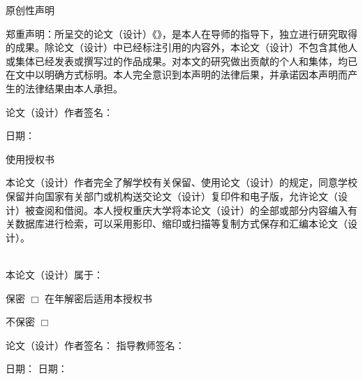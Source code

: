 \clearpage
\thispagestyle{empty}

{}
\begin{center}
\heiti {}
原创性声明
\end{center}

\songti{}
郑重声明：所呈交的论文（设计）《\cquTitleCN》，是本人在导师的指导下，独立进行研究取得的成果。除论文（设计）中已经标注引用的内容外，本论文（设计）不包含其他人或集体已经发表或撰写过的作品成果。对本文的研究做出贡献的个人和集体，均已在文中以明确方式标明。本人完全意识到本声明的法律后果，并承诺因本声明而产生的法律结果由本人承担。

\vspace{20pt}

\noindent\songti{}论文（设计）作者签名：\underline{\hspace{8em}}

\vspace{12pt}

\noindent\songti{}日期：\underline{\hspace{8em}}

\vspace{24pt}

\begin{center}
\heiti {}
使用授权书
\end{center}

\songti{}
本论文（设计）作者完全了解学校有关保留、使用论文（设计）的规定，同意学校保留并向国家有关部门或机构送交论文（设计）复印件和电子版，允许论文（设计）被查阅和借阅。本人授权重庆大学将本论文（设计）的全部或部分内容编入有关数据库进行检索，可以采用影印、缩印或扫描等复制方式保存和汇编本论文（设计）。

~\\
\songti{}
本论文（设计）属于：\par
保\quad 密 $\Box$  \quad 在\underline{\qquad}年解密后适用本授权书\par
不保密 $\Box$

\vspace{24pt}

\noindent\songti{}论文（设计）作者签名：\underline{\hspace{8em}} \hfill 指导教师签名：\underline{\hspace{8em}}

\vspace{12pt}

\noindent\songti{}日期：\underline{\hspace{8em}} \hfill 日期：\underline{\hspace{8em}}
